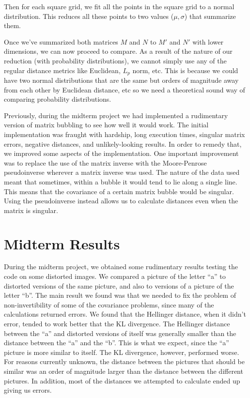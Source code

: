 \documentclass{article}
\begin{document}
Then for each square grid, we fit all the points in the square grid to a normal distribution. This reduces all these points to two values ($\mu, \sigma$) that summarize them.

Once we've summarized both matrices $M$ and $N$ to $M'$ and $N'$ with lower dimensions, we can now proceed to compare. As a result of the nature of our reduction (with probability distributions), we cannot simply use any of the regular distance metrics like Euclidean, $L_p$ norm, etc. This is because we could have two normal distributions that are the same but orders of magnitude away from each other by Euclidean distance, etc so we need a theoretical sound way of comparing probability distributions.

Previously, during the midterm project we had implemented a rudimentary version of matrix bubbling to see how well it would work. The initial implementation was fraught with hardship, long execution times, singular matrix errors, negative distances, and unlikely-looking results. In order to remedy that, we improved some aspects of the implementation. One important improvement was to replace the use of the matrix inverse with the Moore-Penrose pseudoinverse wherever a matrix inverse was used. The nature of the data used meant that sometimes, within a bubble it would tend to lie along a single line. This means that the covariance of a certain matrix bubble would be singular. Using the pseudoinverse instead allows us to calculate distances even when the matrix is singular.

\section{Midterm Results}

During the midterm project, we obtained some rudimentary results testing the code on some distorted images. We compared a picture of the letter ``a'' to distorted versions of the same picture, and also to versions of a picture of the letter ``b''. The main result we found was that we needed to fix the problem of non-invertibility of some of the covariance problems, since many of the calculations returned errors. We found that the Hellinger distance, when it didn't error, tended to work better that the KL divergence. The Hellinger distance between the ``a'' and distorted versions of itself was generally smaller than the distance between the ``a'' and the ``b''. This is what we expect, since the ``a'' picture is more similar to itself. The KL divergence, however, performed worse. For reasons currently unknown, the distance between the pictures that should be similar was an order of magnitude larger than the distance between the different pictures. In addition, most of the distances we attempted to calculate ended up giving us errors.
\end{document}
